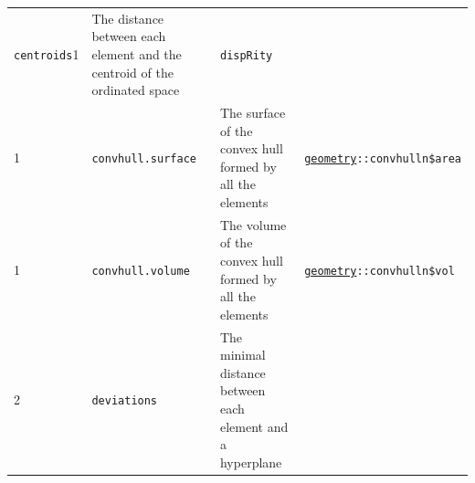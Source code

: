 \documentclass[]{book}
\begin{document}
\begin{longtable}[]{@{}llll@{}}
\begin{minipage}[t]{0.07\columnwidth}
\texttt{centroids}1\strut
\end{minipage} & \begin{minipage}[t]{0.64\columnwidth}\raggedright
The distance between each element and the centroid of the ordinated space\strut
\end{minipage} & \begin{minipage}[t]{0.10\columnwidth}\raggedright
\texttt{dispRity}\strut
\end{minipage}\tabularnewline
\begin{minipage}[t]{0.07\columnwidth}\raggedright
1\strut
\end{minipage} & \begin{minipage}[t]{0.07\columnwidth}\raggedright
\texttt{convhull.surface}\strut
\end{minipage} & \begin{minipage}[t]{0.64\columnwidth}\raggedright
The surface of the convex hull formed by all the elements\strut
\end{minipage} & \begin{minipage}[t]{0.10\columnwidth}\raggedright
\href{https://cran.r-project.org/web/packages/geometry/index.html}{\texttt{geometry}}\texttt{::convhulln\$area}\strut
\end{minipage}\tabularnewline
\begin{minipage}[t]{0.07\columnwidth}\raggedright
1\strut
\end{minipage} & \begin{minipage}[t]{0.07\columnwidth}\raggedright
\texttt{convhull.volume}\strut
\end{minipage} & \begin{minipage}[t]{0.64\columnwidth}\raggedright
The volume of the convex hull formed by all the elements\strut
\end{minipage} & \begin{minipage}[t]{0.10\columnwidth}\raggedright
\href{https://cran.r-project.org/web/packages/geometry/index.html}{\texttt{geometry}}\texttt{::convhulln\$vol}\strut
\end{minipage}\tabularnewline
\begin{minipage}[t]{0.07\columnwidth}\raggedright
2\strut
\end{minipage} & \begin{minipage}[t]{0.07\columnwidth}\raggedright
\texttt{deviations}\strut
\end{minipage} & \begin{minipage}[t]{0.64\columnwidth}\raggedright
The minimal distance between each element and a hyperplane\strut

\end{minipage}
\end{longtable}
\end{document}
